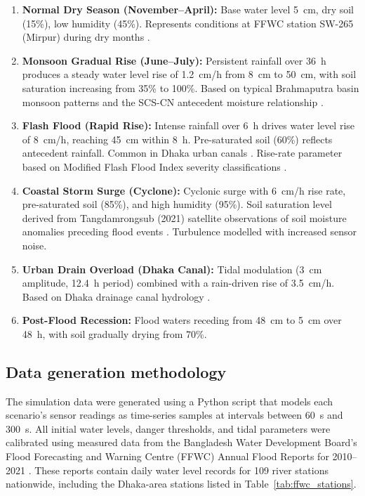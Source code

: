 \documentclass[5p,twocolumn]{elsarticle}
\begin{document}
\begin{enumerate}[nosep]
  \item \textbf{Normal Dry Season (November--April):} Base water level 5~cm, dry soil (15\%), low humidity (45\%). Represents conditions at FFWC station SW-265 (Mirpur) during dry months \cite{bwdb2022}.
  \item \textbf{Monsoon Gradual Rise (June--July):} Persistent rainfall over 36~h produces a steady water level rise of 1.2~cm/h from 8~cm to 50~cm, with soil saturation increasing from 35\% to 100\%. Based on typical Brahmaputra basin monsoon patterns \cite{bwdb2022} and the SCS-CN antecedent moisture relationship \cite{usda2004}.
  \item \textbf{Flash Flood (Rapid Rise):} Intense rainfall over 6~h drives water level rise of 8~cm/h, reaching 45~cm within 8~h. Pre-saturated soil (60\%) reflects antecedent rainfall. Common in Dhaka urban canals \cite{rohan2025}. Rise-rate parameter based on Modified Flash Flood Index severity classifications \cite{kim2014}.
  \item \textbf{Coastal Storm Surge (Cyclone):} Cyclonic surge with 6~cm/h rise rate, pre-saturated soil (85\%), and high humidity (95\%). Soil saturation level derived from Tangdamrongsub (2021) satellite observations of soil moisture anomalies preceding flood events \cite{tangdamrongsub2021}. Turbulence modelled with increased sensor noise.
  \item \textbf{Urban Drain Overload (Dhaka Canal):} Tidal modulation (3~cm amplitude, 12.4~h period) combined with a rain-driven rise of 3.5~cm/h. Based on Dhaka drainage canal hydrology \cite{rohan2025}.
  \item \textbf{Post-Flood Recession:} Flood waters receding from 48~cm to 5~cm over 48~h, with soil gradually drying from 70\%.
\end{enumerate}

\subsection{Data generation methodology}

The simulation data were generated using a Python script that models each scenario's sensor readings as time-series samples at intervals between 60~s and 300~s. All initial water levels, danger thresholds, and tidal parameters were calibrated using measured data from the Bangladesh Water Development Board's Flood Forecasting and Warning Centre (FFWC) Annual Flood Reports for 2010--2021 \cite{ffwc2010,ffwc2011,ffwc2012,ffwc2013,ffwc2014,ffwc2015,ffwc2016,ffwc2017,ffwc2018,ffwc2019,ffwc2020,ffwc2021}. These reports contain daily water level records for 109 river stations nationwide, including the Dhaka-area stations listed in Table~\ref{tab:ffwc_stations}.
\end{document}
